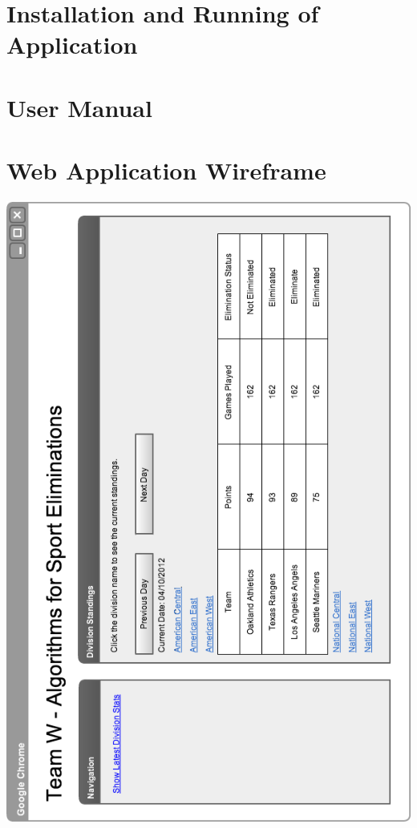 \chapter{Installation and Running of Application}


\chapter{User Manual}


\chapter{Web Application Wireframe}
\label{fig:webApplicationWireframe}
\includegraphics[max width=\linewidth, max height=\measurepage,keepaspectratio]
{images/webApplicationWireframe.png}